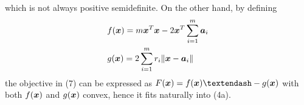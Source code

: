which is not always positive semidefinite.  On the other hand, by defining 
\begin{equation} %
\begin{aligned}
& f(\Bx) =  %
m \Bx^T\Bx - 2 \Bx^T\sum^m_{i=1} \Ba_i \\%
& g(\Bx) = 2 \sum^m_{i = 1} r_i \|\Bx - \Ba_i\|
\end{aligned}
\end{equation}
the objective in (7) can be expressed as $F(\Bx) = f(\Bx) –- g(\Bx)$ with both $f(\mbox{\boldmath$x$})$ and $g(\mbox{\boldmath$x$})$ convex, hence it fits naturally into (4a).
%
